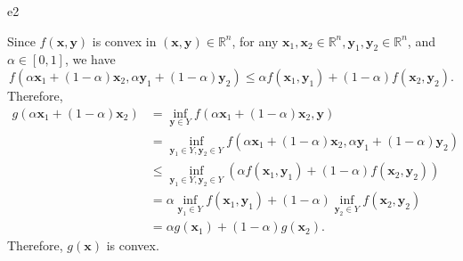 \documentclass{article}
\newcommand{\xB}{\bm{x}}
\newcommand{\yB}{\bm{y}}
\newcommand{\RBB}{\mathbb{R}}
\begin{document}
\begin{PROOF}{e2}

Since $f(\xB, \yB)$ is convex in $(\xB, \yB) \in \RBB^n$, for any $\xB_1, \xB_2 \in \RBB^n, \yB_1, \yB_2 \in \RBB^n$, and $\alpha \in [0, 1]$, we have
\[
f(\alpha \xB_1 + (1 - \alpha) \xB_2, \alpha \yB_1 + (1 - \alpha) \yB_2) \leq \alpha f(\xB_1, \yB_1) + (1 - \alpha) f(\xB_2, \yB_2).
\]
Therefore,
\[
\begin{aligned}
g(\alpha \xB_1 + (1 - \alpha) \xB_2) &= \inf_{\yB \in Y} f(\alpha \xB_1 + (1 - \alpha) \xB_2, \yB) \\
&= \inf_{\yB_1 \in Y, \yB_2 \in Y} f(\alpha \xB_1 + (1 - \alpha) \xB_2, \alpha \yB_1 + (1 - \alpha) \yB_2) \\
&\leq \inf_{\yB_1 \in Y, \yB_2 \in Y} (\alpha f(\xB_1, \yB_1) + (1 - \alpha) f(\xB_2, \yB_2)) \\
&= \alpha \inf_{\yB_1 \in Y} f(\xB_1, \yB_1) + (1 - \alpha) \inf_{\yB_2 \in Y} f(\xB_2, \yB_2) \\
&= \alpha g(\xB_1) + (1 - \alpha) g(\xB_2).
\end{aligned}
\]
Therefore, $g(\xB)$ is convex.
\end{PROOF}
\end{document}
